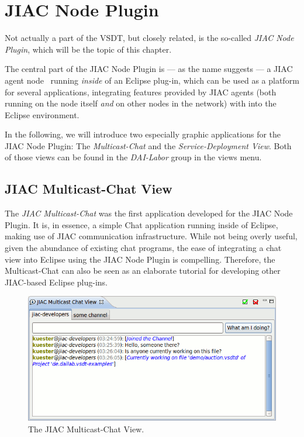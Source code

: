 \chapter{JIAC Node Plugin}
\label{sec:user_jiac-node}

Not actually a part of the VSDT, but closely related, is the so-called \emph{JIAC
Node Plugin}, which will be the topic of this chapter.

The central part of the JIAC Node Plugin is --- as the name suggests --- a JIAC
agent node~\cite{hirsch2009multi-agent} running \emph{inside} of an Eclipse
plug-in, which can be used as a platform for several applications, integrating
features provided by JIAC agents (both running on the node itself \emph{and} on
other nodes in the network) with into the Eclipse environment.

In the following, we will introduce two especially graphic applications for the
JIAC Node Plugin: The \emph{Multicast-Chat} and the \emph{Service-Deployment
View}.  Both of those views can be found in the \emph{DAI-Labor} group in the
views menu.



\section{JIAC Multicast-Chat View}

The \emph{JIAC Multicast-Chat} was the first application developed for the JIAC
Node Plugin.  It is, in essence, a simple Chat application running inside of
Eclipse, making use of JIAC communication infrastructure.  While not being overly
useful, given the abundance of existing chat programs, the ease of integrating a
chat view into Eclipse using the JIAC Node Plugin is compelling.  Therefore, the
Multicast-Chat can also be seen as an elaborate tutorial for developing other
JIAC-based Eclipse plug-ins.

\begin{figure}[ht]
	\centering
	\includegraphics[width=.5\textwidth]{figures/features/multicast-chat.png}
	\caption{The JIAC Multicast-Chat View.}
	\label{fig:chatView}
\end{figure}

